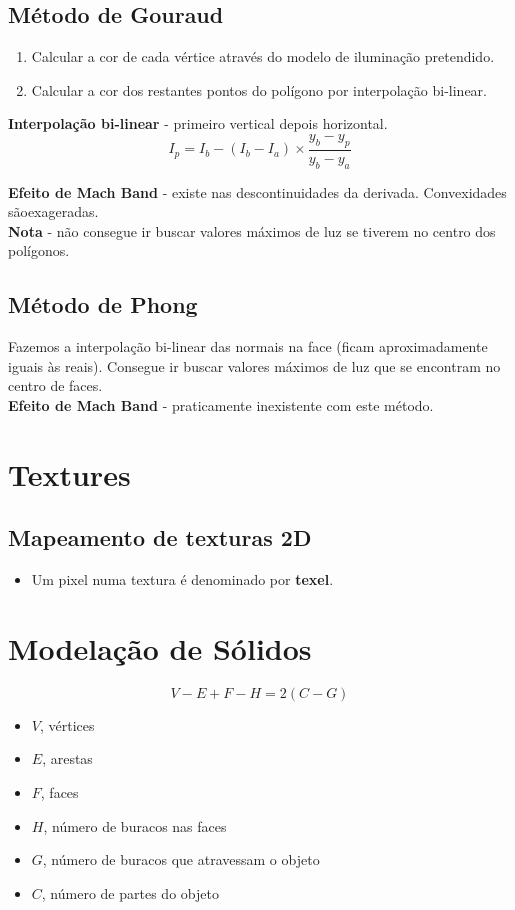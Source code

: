 \documentclass{report}
\begin{document}
\section{Método de Gouraud}
\begin{enumerate}
\item Calcular a cor de cada vértice através do modelo de iluminação pretendido.
\item Calcular a cor dos restantes pontos do polígono por interpolação bi-linear.
\end{enumerate}
\textbf{Interpolação bi-linear} - primeiro vertical depois horizontal.\\

\begin{equation}
    I_p = I_b - (I_b - I_a) \times \frac{y_b - y_p}{y_b - y_a}
\end{equation}

\textbf{Efeito de Mach Band} - existe nas descontinuidades da derivada. Convexidades sãoexageradas.\\
\textbf{Nota} - não consegue ir buscar valores máximos de luz se tiverem no centro dos polígonos.

\section{Método de Phong}
Fazemos a interpolação bi-linear das normais na face (ficam aproximadamente iguais às reais).
Consegue ir buscar valores máximos de luz que se encontram no centro de faces.\\
\textbf{Efeito de Mach Band} - praticamente inexistente com este método.

\chapter{Textures}
\section{Mapeamento de texturas 2D}
\begin{itemize}
\item Um pixel numa textura é denominado por \textbf{texel}.
\end{itemize}

\chapter{Modelação de Sólidos}

\begin{equation}
    V - E + F - H = 2 (C - G)
\end{equation}

\begin{itemize}
    \item $V$, vértices
    \item $E$, arestas
    \item $F$, faces
    \item $H$, número de buracos nas faces
    \item $G$, número de buracos que atravessam o objeto
    \item $C$, número de partes do objeto
\end{itemize}
\end{document}
